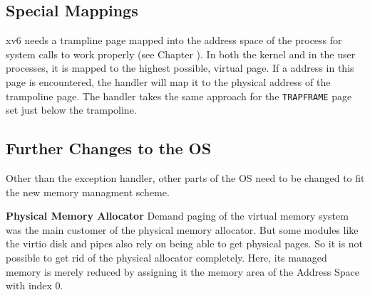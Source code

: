 





\subsection{Special Mappings}
xv6 needs a trampline page mapped into the address space of the process for system calls to work properly (see Chapter ).
In both the kernel and in the user processes, it is mapped to the highest possible, virtual page.
If a address in this page is encountered, the handler will map it to the physical address of the trampoline page.
The handler takes the same approach for the \texttt{TRAPFRAME} page set just below the trampoline.

\subsection{Further Changes to the OS}
Other than the exception handler, other parts of the OS need to be changed to fit the new memory managment scheme.

\textbf{Physical Memory Allocator} %
Demand paging of the virtual memory system was the main customer of the physical memory allocator.
But some modules like the virtio disk and pipes also rely on being able to get physical pages. So it is not
possible to get rid of the physical allocator completely.
Here, its managed memory is merely reduced by assigning it the memory area of the Address Space with index 0.

